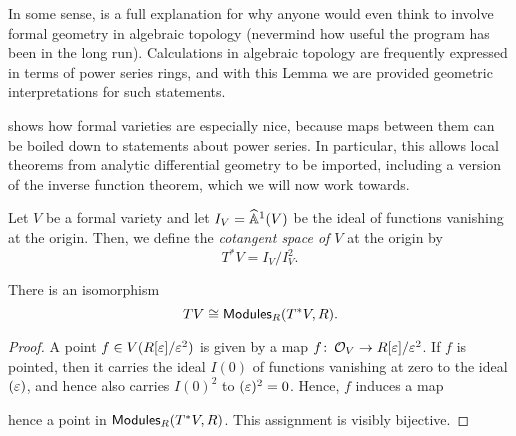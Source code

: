 \begin{remark}
In some sense,  is a full explanation for why anyone would even think to involve formal geometry in algebraic topology (nevermind how useful the program has been in the long run).  Calculations in algebraic topology are frequently expressed in terms of power series rings, and with this Lemma we are provided geometric interpretations for such statements.
\end{remark}

 shows how formal varieties are especially nice, because maps between them can be boiled down to statements about power series.  In particular, this allows local theorems from analytic differential geometry to be imported, including a version of the inverse function theorem, which we will now work towards.

\begin{definition}
Let $V$ be a formal variety and let $I_V = \widehat{\mathbb{A}}^1(V)$  be the ideal of functions vanishing at the origin.  Then, we define the \textit{cotangent space of $V$} at the origin by \[T^* V = I_V / I_V^2.\]
\end{definition}

\begin{lemma}
There is an isomorphism \[TV \cong \mathsf{Modules}_R(T^* V, R).\]
\end{lemma}
\begin{proof}
A point $f \in V(R[\varepsilon] / \varepsilon^2)$ is given by a map $f\colon\thinspace \mathcal{O}_V \to R[\varepsilon] / \varepsilon^2$.  If $f$ is pointed, then it carries the ideal $I(0)$ of functions vanishing at zero to the ideal $(\varepsilon)$, and hence also carries $I(0)^2$ to $(\varepsilon)^2 = 0$.  Hence, $f$ induces a map
\begin{center}
\end{center}
hence a point in $\mathsf{Modules}_R(T^* V, R)$.  This assignment is visibly bijective.
\end{proof}


